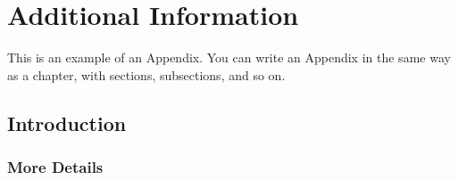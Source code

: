 
\chapter{Additional Information}
This is an example of an Appendix. You can write an Appendix in the same way as a chapter, with sections, subsections, and so on.

\section{Introduction}

\subsection{More Details}